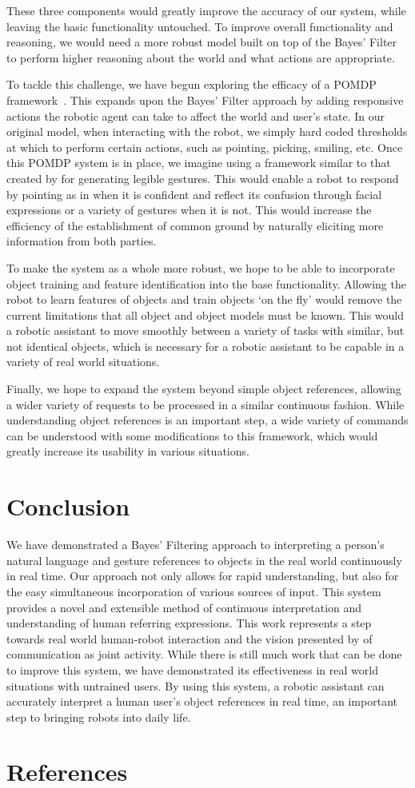 \documentclass[a4paper, 11pt]{article} %
\begin{document}
These three components would greatly improve the accuracy of our system, while leaving the basic functionality untouched. To improve overall functionality and reasoning, we would need a more robust model built on top of the Bayes' Filter to perform higher reasoning about the world and what actions are appropriate.

To tackle this challenge, we have begun exploring the efficacy of a POMDP framework~\citep{kaelbling99}. This expands upon the Bayes' Filter approach by adding responsive actions the robotic agent can take to affect the world and user's state. In our original model, when interacting with the robot, we simply hard coded thresholds at which to perform certain actions, such as pointing, picking, smiling, etc. Once this POMDP system is in place, we imagine using a framework similar to that created by \citet{dragan13} for generating legible gestures. This would enable a robot to respond by pointing as in \citet{holladay14} when it is confident and reflect its confusion through facial expressions or a variety of gestures when it is not. This would increase the efficiency of the establishment of common ground by naturally eliciting more information from both parties.

To make the system as a whole more robust, we hope to be able to incorporate object training and feature identification into the base functionality. Allowing the robot to learn features of objects and train objects `on the fly' would remove the current limitations that all object and object models must be known. This would a robotic assistant to move smoothly between a variety of tasks with similar, but not identical objects, which is necessary for a robotic assistant to be capable in a variety of real world situations.

Finally, we hope to expand the system beyond simple object references, allowing a wider variety of requests to be processed in a similar continuous fashion. While understanding object references is an important step, a wide variety of commands can be understood with some modifications to this framework, which would greatly increase its usability in various situations.
\section{Conclusion}
We have demonstrated a Bayes' Filtering approach to interpreting a person's natural language and gesture references to objects in the real world continuously in real time. Our approach not only allows for rapid understanding, but also for the easy simultaneous incorporation of various sources of input. This system provides a novel and extensible method of continuous interpretation and understanding of human referring expressions. This work represents a step towards real world human-robot interaction and the vision presented by \citet{clark96} of communication as joint activity. While there is still much work that can be done to improve this system, we have demonstrated its effectiveness in real world situations with untrained users. By using this system, a robotic assistant can accurately interpret a human user's object references in real time, an important step to bringing robots into daily life.
\newpage
{}
\section*{\centering References}


\end{document}
